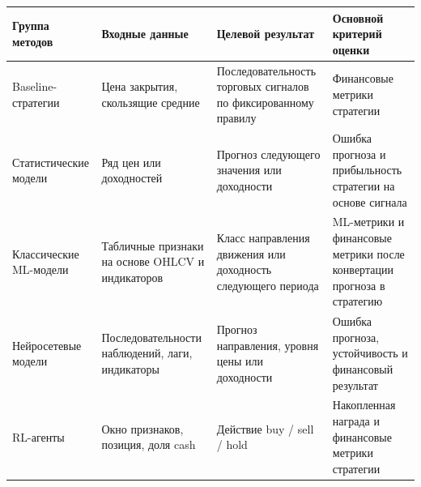 \begin{center}
\small
\begin{tabularx}{\textwidth}{|p{2.8cm}|p{2.7cm}|X|p{2.8cm}|}
\hline
\textbf{Группа методов} & \textbf{Входные данные} & \textbf{Целевой результат} & \textbf{Основной критерий оценки} \\
\hline
Baseline-стратегии & Цена закрытия, скользящие средние & Последовательность торговых сигналов по фиксированному правилу & Финансовые метрики стратегии \\
\hline
Статистические модели & Ряд цен или доходностей & Прогноз следующего значения или доходности & Ошибка прогноза и прибыльность стратегии на основе сигнала \\
\hline
Классические ML-модели & Табличные признаки на основе OHLCV и индикаторов & Класс направления движения или доходность следующего периода & ML-метрики и финансовые метрики после конвертации прогноза в стратегию \\
\hline
Нейросетевые модели & Последовательности наблюдений, лаги, индикаторы & Прогноз направления, уровня цены или доходности & Ошибка прогноза, устойчивость и финансовый результат \\
\hline
RL-агенты & Окно признаков, позиция, доля cash & Действие buy / sell / hold & Накопленная награда и финансовые метрики стратегии \\
\hline
\end{tabularx}
\end{center}
